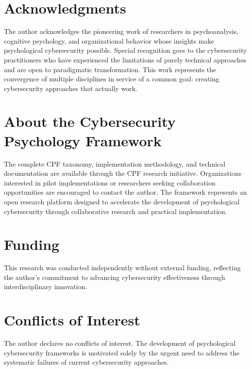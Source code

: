 \documentclass[10pt, twocolumn]{article}
\begin{document}
\section*{Acknowledgments}

The author acknowledges the pioneering work of researchers in psychoanalysis, cognitive psychology, and organizational behavior whose insights make psychological cybersecurity possible. Special recognition goes to the cybersecurity practitioners who have experienced the limitations of purely technical approaches and are open to paradigmatic transformation. This work represents the convergence of multiple disciplines in service of a common goal: creating cybersecurity approaches that actually work.

\section*{About the Cybersecurity Psychology Framework}

The complete CPF taxonomy, implementation methodology, and technical documentation are available through the CPF research initiative. Organizations interested in pilot implementations or researchers seeking collaboration opportunities are encouraged to contact the author. The framework represents an open research platform designed to accelerate the development of psychological cybersecurity through collaborative research and practical implementation.

\section*{Funding}

This research was conducted independently without external funding, reflecting the author's commitment to advancing cybersecurity effectiveness through interdisciplinary innovation.

\section*{Conflicts of Interest}

The author declares no conflicts of interest. The development of psychological cybersecurity frameworks is motivated solely by the urgent need to address the systematic failures of current cybersecurity approaches.
\end{document}
